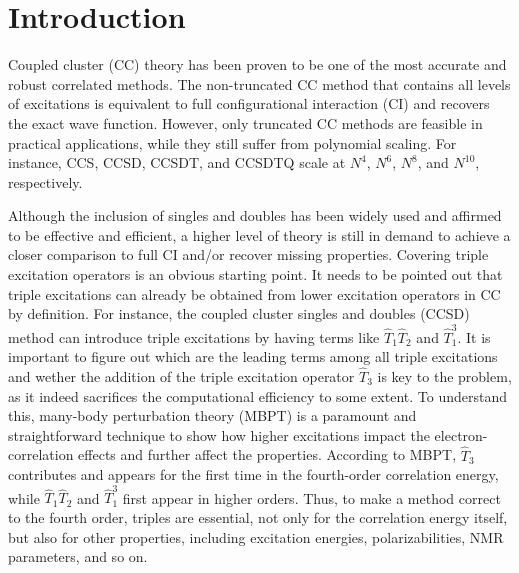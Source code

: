 \section{Introduction} \label{ch4-intro}
Coupled cluster (CC) theory\cite{Purvis1982, Crawford2000} has been proven to be one of the most accurate and robust correlated methods. The non-truncated CC method that contains all levels of excitations is equivalent to full configurational interaction (CI)\cite{Sherrill1999} and recovers the exact wave function. However, only truncated CC methods are feasible in practical applications, while they still suffer from polynomial scaling. For instance, CCS, CCSD,\cite{Purvis1982} CCSDT,\cite{Noga1987, Scuseria1988} and CCSDTQ\cite{Kucharski1998} scale at $N^{4}$, $N^{6}$, $N^{8}$, and $N^{10}$, respectively. 

Although the inclusion of singles and doubles has been widely used and affirmed to be effective and efficient, a higher level of theory is still in demand to achieve a closer comparison to full CI and/or recover missing properties. Covering triple excitation operators is an obvious starting point. It needs to be pointed out that triple excitations can already be obtained from lower excitation operators in CC by definition. For instance, the coupled cluster singles and doubles (CCSD) method can introduce triple excitations by having terms like $\hat{T}_{1}\hat{T}_{2}$ and $\hat{T}_{1}^{3}$. It is important to figure out which are the leading terms among all triple excitations and wether the addition of the triple excitation operator $\hat{T}_{3}$ is key to the problem, as it indeed sacrifices the computational efficiency to some extent. To understand this, many-body perturbation theory (MBPT)\cite{Bartlett1981} is a paramount and straightforward technique to show how higher excitations impact the electron-correlation effects and further affect the properties. According to MBPT, $\hat{T}_{3}$ contributes and appears for the first time in the fourth-order correlation energy, while $\hat{T}_{1}\hat{T}_{2}$ and $\hat{T}_{1}^{3}$ first appear in higher orders. Thus, to make a method correct to the fourth order, triples are essential, not only for the correlation energy itself,\cite{Lee1984} but also for other properties, including excitation energies,\cite{Christiansen1995CC3, Watts1995, Christiansen1996, Kucharski2001} polarizabilities,\cite{Christiansen1998triple, Hald2003} NMR parameters,\cite{Gauss1996, Faber2017, Jaszunski2020} and so on.

